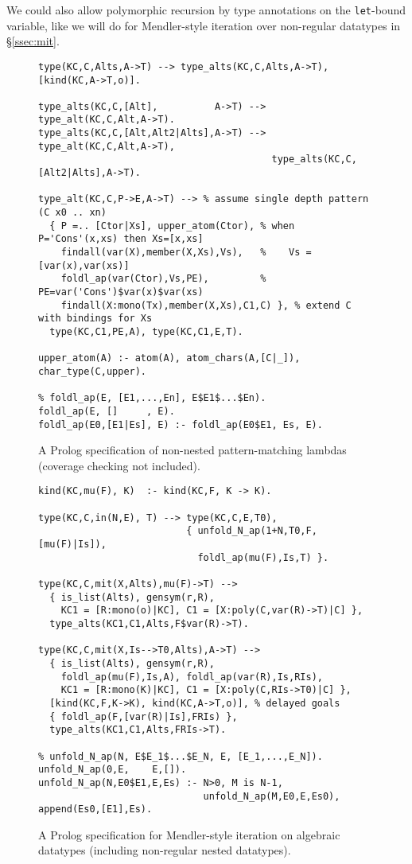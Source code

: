 \documentclass[runningheads,a4paper]{llncs}
\begin{document}
We could also allow polymorphic recursion by type annotations
on the \texttt{let}-bound variable, like we will do for Mendler-style iteration
over non-regular datatypes in \S\ref{ssec:mit}.

\begin{figure} %
\begin{verbatim}
type(KC,C,Alts,A->T) --> type_alts(KC,C,Alts,A->T), [kind(KC,A->T,o)].

type_alts(KC,C,[Alt],          A->T) --> type_alt(KC,C,Alt,A->T).
type_alts(KC,C,[Alt,Alt2|Alts],A->T) --> type_alt(KC,C,Alt,A->T),
                                         type_alts(KC,C,[Alt2|Alts],A->T).

type_alt(KC,C,P->E,A->T) --> % assume single depth pattern (C x0 .. xn)
  { P =.. [Ctor|Xs], upper_atom(Ctor), % when P='Cons'(x,xs) then Xs=[x,xs]
    findall(var(X),member(X,Xs),Vs),   %    Vs = [var(x),var(xs)]  
    foldl_ap(var(Ctor),Vs,PE),         %    PE=var('Cons')$var(x)$var(xs)
    findall(X:mono(Tx),member(X,Xs),C1,C) }, % extend C with bindings for Xs
  type(KC,C1,PE,A), type(KC,C1,E,T).

upper_atom(A) :- atom(A), atom_chars(A,[C|_]), char_type(C,upper).

% foldl_ap(E, [E1,...,En], E$E1$...$En).
foldl_ap(E, []     , E).
foldl_ap(E0,[E1|Es], E) :- foldl_ap(E0$E1, Es, E).
\end{verbatim}
\vspace*{-2ex}
\caption{A Prolog specification of non-nested pattern-matching lambdas
$\qquad$ (coverage checking not included).}
\label{fig:patlam}
\end{figure}
\begin{figure} %
\begin{verbatim}
kind(KC,mu(F), K)  :- kind(KC,F, K -> K).

type(KC,C,in(N,E), T) --> type(KC,C,E,T0),
                          { unfold_N_ap(1+N,T0,F,[mu(F)|Is]),
                            foldl_ap(mu(F),Is,T) }.

type(KC,C,mit(X,Alts),mu(F)->T) -->
  { is_list(Alts), gensym(r,R),
    KC1 = [R:mono(o)|KC], C1 = [X:poly(C,var(R)->T)|C] },
  type_alts(KC1,C1,Alts,F$var(R)->T).

type(KC,C,mit(X,Is-->T0,Alts),A->T) -->
  { is_list(Alts), gensym(r,R),
    foldl_ap(mu(F),Is,A), foldl_ap(var(R),Is,RIs),
    KC1 = [R:mono(K)|KC], C1 = [X:poly(C,RIs->T0)|C] },
  [kind(KC,F,K->K), kind(KC,A->T,o)], % delayed goals
  { foldl_ap(F,[var(R)|Is],FRIs) },
  type_alts(KC1,C1,Alts,FRIs->T).

% unfold_N_ap(N, E$E_1$...$E_N, E, [E_1,...,E_N]).
unfold_N_ap(0,E,    E,[]).
unfold_N_ap(N,E0$E1,E,Es) :- N>0, M is N-1,
                             unfold_N_ap(M,E0,E,Es0), append(Es0,[E1],Es).
\end{verbatim}
\vspace*{-1ex}
\caption{A Prolog specification for Mendler-style iteration
  on algebraic datatypes (including non-regular nested datatypes).}
\label{fig:mit}
\end{figure}
\end{document}
